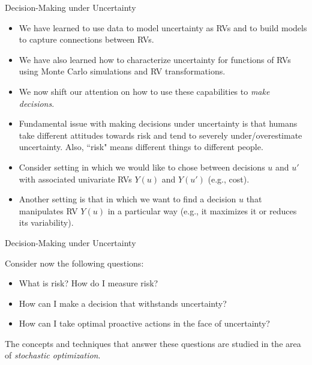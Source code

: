 \documentclass[9pt]{beamer}
\begin{document}
%
\begin{frame}{Decision-Making under Uncertainty}
\begin{itemize}

\item We have learned to use data to model uncertainty as RVs and to build models to capture connections between RVs. 
\item We have also learned how to characterize uncertainty for functions of RVs using Monte Carlo simulations and RV transformations. 

\item We now shift our attention on how to use these capabilities to {\em make decisions}. 

\item Fundamental issue with making decisions under uncertainty is that humans take different attitudes towards risk and tend to severely under/overestimate uncertainty. Also, ``risk" means different things to different people. 

\item Consider setting in which we would like to chose between decisions $u$ and $u'$ with associated univariate RVs $Y(u)$ and $Y(u')$ (e.g., cost). 

\item Another setting is that in which we want to find a decision $u$ that manipulates RV $Y(u)$ in a particular way (e.g., it maximizes it or reduces its variability). 

\end{itemize}

\end{frame}

%
\begin{frame}{Decision-Making under Uncertainty}

Consider now the following questions:

\begin{block}{}
\begin{itemize}
\item What is risk? How do I measure risk?
\item How can I make a decision that withstands uncertainty?
\item How can I take optimal proactive actions in the face of uncertainty?
\end{itemize}
\end{block}
The concepts and techniques that answer these questions are studied in the area of {\em stochastic optimization}. 


\end{frame}
\end{document}
